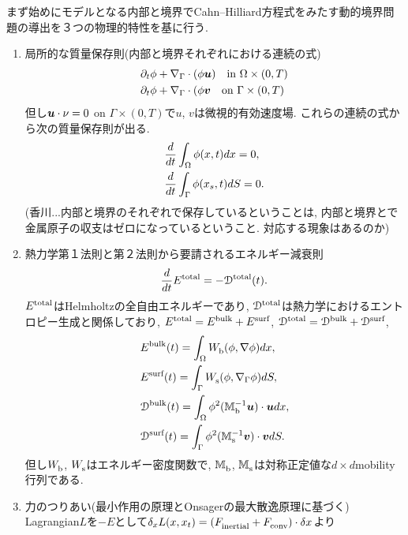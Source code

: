 \documentclass[openary, a4paper, oneside]{jsarticle}
\begin{document}
まず始めにモデルとなる内部と境界でCahn--Hilliard方程式をみたす動的境界問題の導出を３つの物理的特性を基に行う.
\begin{enumerate}
	\item 局所的な質量保存則(内部と境界それぞれにおける連続の式)
	\begin{align}
		&\partial_t\phi + \nabla_{\Gamma}\cdot(\phi\bm{u})\quad\text{in }\Omega\times(0,T)\\
		&\partial_t\phi + \nabla_{\Gamma}\cdot(\phi\bm{v}\quad\text{on }\Gamma\times(0,T)
	\end{align}
	但し$\bm{u}\cdot\nu = 0$ on $\Gamma\times(0,T)$で$u$, $v$は微視的有効速度場.
	これらの連続の式から次の質量保存則が出る.
	\begin{align}
		&\frac{d}{dt}\int_{\Omega}\phi(x,t)dx = 0,\\
		&\frac{d}{dt}\int_{\Gamma}\phi(x_s,t)dS = 0.
	\end{align}
	(香川...内部と境界のそれぞれで保存しているということは, 内部と境界とで金属原子の収支はゼロになっているということ.
	対応する現象はあるのか)
	\item 熱力学第１法則と第２法則から要請されるエネルギー減衰則
	\begin{equation}
		\frac{d}{dt}{E}^{\text{total}}_{\text{}} = -{\mathcal{D}}^{\text{total}}_{\text{}}(t).
	\end{equation}
	${E}^{\text{total}}_{\text{}}$はHelmholtzの全自由エネルギーであり, ${\mathcal{D}}^{\text{total}}_{\text{}}$は熱力学におけるエントロピー生成と関係しており, ${E}^{\text{total}}_{\text{}} = {E}^{\text{bulk}}_{\text{}} + {E}^{\text{surf}}_{\text{}}$, ${\mathcal{D}}^{\text{total}}_{\text{}} = {\mathcal{D}}^{\text{bulk}}_{\text{}} + {\mathcal{D}}^{\text{surf}}_{\text{}}$,
	\begin{align}
		&{E}^{\text{bulk}}_{\text{}}(t) = \int_{\Omega} {W}^{\text{}}_{\text{b}}(\phi,\nabla\phi)dx,\\
		&{E}^{\text{surf}}_{\text{}}(t) = \int_{\Gamma}{W}^{\text{}}_{\text{s}}(\phi,\nabla_{\Gamma}\phi)dS,\\
		&{\mathcal{D}}^{\text{bulk}}_{\text{}}(t) = \int_{\Omega}\phi^2({\mathbb{M}}^{\text{$-1$}}_{\text{b}}\bm{u})\cdot\bm{u}dx,\\
		&{\mathcal{D}}^{\text{surf}}_{\text{}}(t) = \int_{\Gamma}\phi^2({\mathbb{M}}^{\text{$-1$}}_{\text{s}}\bm{v})\cdot\bm{v}dS.
	\end{align}
	但し${W}^{\text{}}_{\text{b}}$, ${W}^{\text{}}_{\text{s}}$はエネルギー密度関数で,
	${\mathbb{M}}^{\text{}}_{\text{b}}$, ${\mathbb{M}}^{\text{}}_{\text{s}}$は対称正定値な$d\times d$mobility行列である.
	\item 力のつりあい(最小作用の原理とOnsagerの最大散逸原理に基づく)
	Lagrangian$L$を$-E$として$\delta_x L(x,x_t)=({F}^{\text{}}_{\text{inertial}} + {F}^{\text{}}_{\text{conv}})\cdot\delta x$より
	\begin{align}

\end{align}
\end{enumerate}
\end{document}
